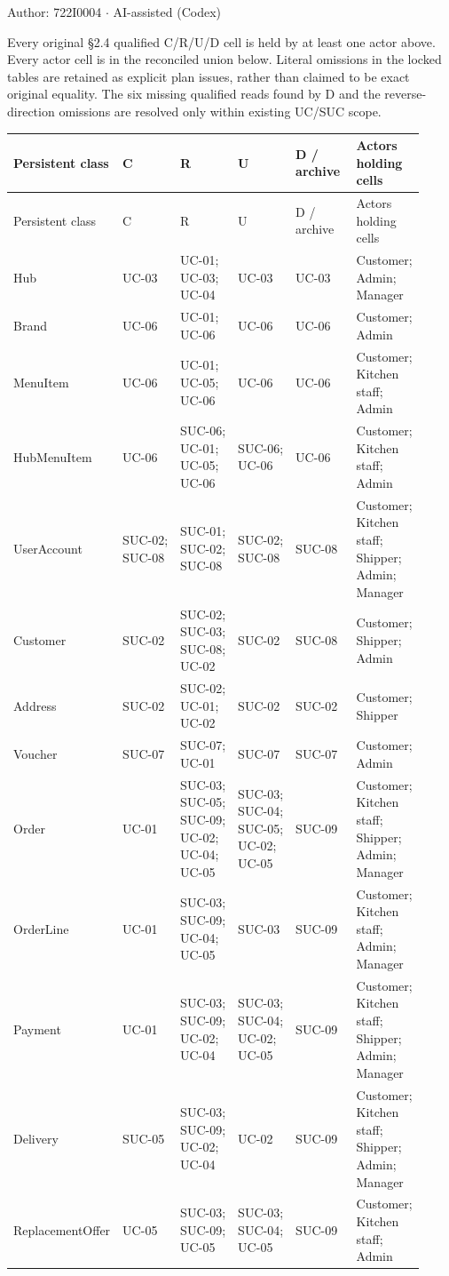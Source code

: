Author: 722I0004 \ensuremath{\cdot} AI-assisted (Codex)

Every original \S{}2.4 qualified C/R/U/D cell is held by at least one actor above. Every actor cell is in the reconciled union below. Literal omissions in the locked tables are retained as explicit plan issues, rather than claimed to be exact original equality. The six missing qualified reads found by D and the reverse-direction omissions are resolved only within existing UC/SUC scope.

\begingroup\footnotesize
\begin{longtable}{>{\raggedright\arraybackslash}p{0.1533\linewidth}>{\raggedright\arraybackslash}p{0.1533\linewidth}>{\raggedright\arraybackslash}p{0.1533\linewidth}>{\raggedright\arraybackslash}p{0.1533\linewidth}>{\raggedright\arraybackslash}p{0.1533\linewidth}>{\raggedright\arraybackslash}p{0.1533\linewidth}}
Persistent class & C & R & U & D / archive & Actors holding cells \\
\hline\endfirsthead
Persistent class & C & R & U & D / archive & Actors holding cells \\
\hline\endhead
Hub & UC-03 & UC-01; UC-03; UC-04 & UC-03 & UC-03 & Customer; Admin; Manager \\
Brand & UC-06 & UC-01; UC-06 & UC-06 & UC-06 & Customer; Admin \\
MenuItem & UC-06 & UC-01; UC-05; UC-06 & UC-06 & UC-06 & Customer; Kitchen staff; Admin \\
HubMenuItem & UC-06 & SUC-06; UC-01; UC-05; UC-06 & SUC-06; UC-06 & UC-06 & Customer; Kitchen staff; Admin \\
UserAccount & SUC-02; SUC-08 & SUC-01; SUC-02; SUC-08 & SUC-02; SUC-08 & SUC-08 & Customer; Kitchen staff; Shipper; Admin; Manager \\
Customer & SUC-02 & SUC-02; SUC-03; SUC-08; UC-02 & SUC-02 & SUC-08 & Customer; Shipper; Admin \\
Address & SUC-02 & SUC-02; UC-01; UC-02 & SUC-02 & SUC-02 & Customer; Shipper \\
Voucher & SUC-07 & SUC-07; UC-01 & SUC-07 & SUC-07 & Customer; Admin \\
Order & UC-01 & SUC-03; SUC-05; SUC-09; UC-02; UC-04; UC-05 & SUC-03; SUC-04; SUC-05; UC-02; UC-05 & SUC-09 & Customer; Kitchen staff; Shipper; Admin; Manager \\
OrderLine & UC-01 & SUC-03; SUC-09; UC-04; UC-05 & SUC-03 & SUC-09 & Customer; Kitchen staff; Admin; Manager \\
Payment & UC-01 & SUC-03; SUC-09; UC-02; UC-04 & SUC-03; SUC-04; UC-02; UC-05 & SUC-09 & Customer; Kitchen staff; Shipper; Admin; Manager \\
Delivery & SUC-05 & SUC-03; SUC-09; UC-02; UC-04 & UC-02 & SUC-09 & Customer; Kitchen staff; Shipper; Admin; Manager \\
ReplacementOffer & UC-05 & SUC-03; SUC-09; UC-05 & SUC-03; SUC-04; UC-05 & SUC-09 & Customer; Kitchen staff; Admin \\
\end{longtable}
